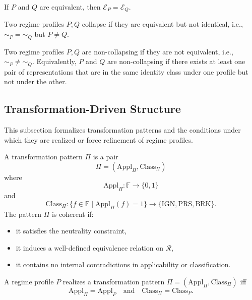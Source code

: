  If $P$ and $Q$ are equivalent, then
  $\mathcal{E}_P = \mathcal{E}_Q$.


\begin{definition}[Collapse]
  \label{def:collapse}
  Two regime profiles $P, Q$ collapse if they are equivalent but not identical,
  i.e., $\sim_P = \sim_Q$ but $P \neq Q$.
\end{definition}

\begin{definition}
  \label{def:non_collapse}
  Two regime profiles $P, Q$ are non-collapsing if they are not equivalent,
  i.e., $\sim_P \neq \sim_Q$.
  Equivalently, $P$ and $Q$ are non-collapsing if there exists at least one pair of representations
  that are in the same identity class under one profile but not under the other.
\end{definition}


\subsection{Transformation-Driven Structure}
\label{subsec:transformation_structure}

This subsection formalizes transformation patterns and the conditions
under which they are realized or force refinement of regime profiles.

\begin{definition}
  \label{def:coherent_transformation_pattern}
  A transformation pattern $\Pi$ is a pair
  \[
    \Pi = (\mathrm{Appl}_\Pi,\mathrm{Class}_\Pi)
  \]
  where
  \[
    \mathrm{Appl}_\Pi : \mathbb{F} \to \{0,1\}
  \]
  and
  \[
    \mathrm{Class}_\Pi :
    \{ f \in \mathbb{F} \mid \mathrm{Appl}_\Pi(f)=1 \}
    \to
    \{ \mathrm{IGN}, \mathrm{PRS}, \mathrm{BRK} \}.
  \]
  The pattern $\Pi$ is coherent if:
  \begin{itemize}
    \item it satisfies the neutrality constraint,
    \item it induces a well-defined equivalence relation on $\mathcal{R}$,
    \item it contains no internal contradictions in applicability or classification.
  \end{itemize}
\end{definition}

\begin{definition}
  \label{def:profile_realization}
  A regime profile $P$ realizes a transformation pattern $\Pi = (\mathrm{Appl}_\Pi,\mathrm{Class}_\Pi)$ iff
  \[
    \mathrm{Appl}_\Pi = \mathrm{Appl}_P
    \quad\text{and}\quad
    \mathrm{Class}_\Pi = \mathrm{Class}_P.
  \]
\end{definition}

